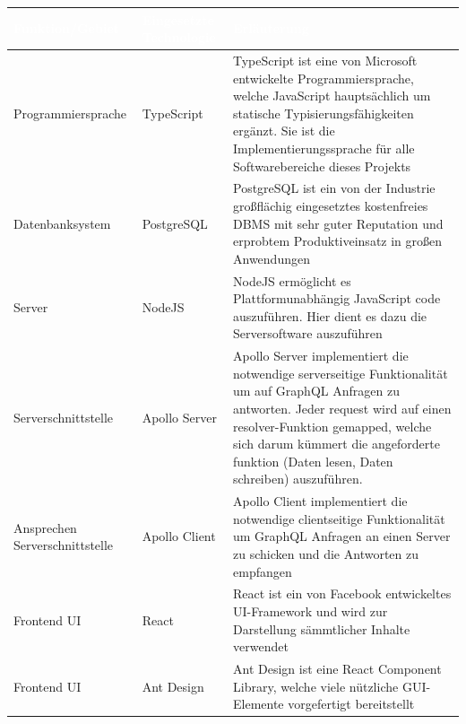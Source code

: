 \documentclass[a4paper,12pt]{article}
\begin{document}
\begin{center}
      \begin{tabular}{|m{4cm}|m{2.5cm}|m{8.5cm}|}
            \hline
        \rowcolor{TUMBlue} \textcolor{white}{\textbf{Funktion/Gebiet}} & \textcolor{white}{\textbf{Eingesetzte Technologie}} & \textcolor{white}{\textbf{Erläuterung}} \\
        \hline
        Programmiersprache & TypeScript & TypeScript ist eine von Microsoft entwickelte Programmiersprache, welche JavaScript hauptsächlich um statische Typisierungsfähigkeiten ergänzt. Sie ist die Implementierungssprache für alle Softwarebereiche dieses Projekts \\
        \hline
        Datenbanksystem & PostgreSQL & PostgreSQL ist ein von der Industrie großflächig eingesetztes kostenfreies DBMS mit sehr guter Reputation und erprobtem Produktiveinsatz in großen Anwendungen \\
        \hline
        Server & NodeJS & NodeJS ermöglicht es Plattformunabhängig JavaScript code auszuführen. Hier dient es dazu die Serversoftware auszuführen \\
        \hline
        Serverschnittstelle & Apollo Server & Apollo Server implementiert die notwendige serverseitige Funktionalität um auf GraphQL Anfragen zu antworten. Jeder request wird auf einen resolver-Funktion gemapped, welche sich darum kümmert die angeforderte funktion (Daten lesen, Daten schreiben) auszuführen. \\
        \hline
        Ansprechen Serverschnittstelle & Apollo Client & Apollo Client implementiert die notwendige clientseitige Funktionalität um GraphQL Anfragen an einen Server zu schicken und die Antworten zu empfangen \\
        \hline
        Frontend UI & React & React ist ein von Facebook entwickeltes UI-Framework und wird zur Darstellung sämmtlicher Inhalte verwendet \\
        \hline
        Frontend UI & Ant Design & Ant Design ist eine React Component Library, welche viele nützliche GUI-Elemente vorgefertigt bereitstellt \\
        \hline
      \end{tabular}
\end{center}
\end{document}
